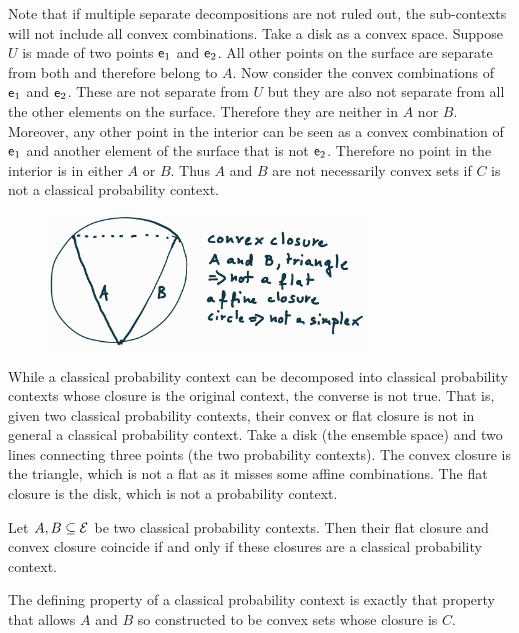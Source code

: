 \begin{mathSection}
\begin{remark}
	Note that if multiple separate decompositions are not ruled out, the sub-contexts will not include all convex combinations. Take a disk as a convex space. Suppose $U$ is made of two points $\mathsf{e}_1$ and $\mathsf{e}_2$. All other points on the surface are separate from both and therefore belong to $A$. Now consider the convex combinations of $\mathsf{e}_1$ and $\mathsf{e}_2$. These are not separate from $U$ but they are also not separate from all the other elements on the surface. Therefore they are neither in $A$ nor $B$. Moreover, any other point in the interior can be seen as a convex combination of $\mathsf{e}_1$ and another element of the surface that is not $\mathsf{e}_2$. Therefore no point in the interior is in either $A$ or $B$. Thus $A$ and $B$ are not necessarily convex sets if $C$ is not a classical probability context.
\end{remark}

\begin{figure}[H]
	\centering
	\includegraphics[width=0.75\textwidth]{tempimages/ContextClosureNotContext.jpg}
\end{figure}

\begin{remark}
	While a classical probability context can be decomposed into classical probability contexts whose closure is the original context, the converse is not true. That is, given two classical probability contexts, their convex or flat closure is not in general a classical probability context. Take a disk (the ensemble space) and two lines connecting three points (the two probability contexts). The convex closure is the triangle, which is not a flat as it misses some affine combinations. The flat closure is the disk, which is not a probability context.
\end{remark}

\begin{conj}
	Let $A, B \subseteq \mathcal{E}$ be two classical probability contexts. Then their flat closure and convex closure coincide if and only if these closures are a classical probability context.
\end{conj}

\begin{conj}
	The defining property of a classical probability context is exactly that property that allows $A$ and $B$ so constructed to be convex sets whose closure is $C$.
\end{conj}
\end{mathSection}

